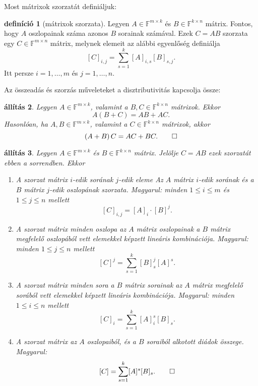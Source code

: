 \documentclass[9pt, a4paper, showtrims]{memoir}
\theoremstyle{plain}
\newtheorem{proposition}{állítás}[chapter]
\theoremstyle{remark}
\theoremstyle{definition}
\newtheorem{definition}[proposition]{definíció}
\begin{document}
Most mátrixok szorzatát definiáljuk:
\begin{definition}[mátrixok szorzata]
    Legyen $A\in\mathbb{F}^{m\times k}$ és $B\in\mathbb{F}^{k\times n}$ mátrix.
    Fontos, hogy $A$ oszlopainak száma azonos $B$ sorainak számával.
    Ezek $C=AB$ szorzata egy $C\in\mathbb{F}^{m\times n}$ mátrix,
    melynek elemeit az alábbi egyenlőség definiálja
    \[
        [C]_{i,j}=\sum_{s=1}^k[A]_{i,s}[B]_{s,j}.
    \]
    Itt persze $i=1,\dots,m$ és $j=1,\dots,n.$
\end{definition}
Az összeadás és szorzás műveleteket a disztributivitás kapcsolja össze:
\begin{proposition}
    Legyen $A\in\mathbb{F}^{m\times k}$, valamint a $B,C\in\mathbb{F}^{k\times n}$ mátrixok.
    Ekkor
    \begin{displaymath}
        A\left( B+C \right)=AB+AC.
    \end{displaymath}
    Hasonlóan,
    ha $A,B\in\mathbb{F}^{m\times k}$, valamint a $C\in\mathbb{F}^{k\times n}$ mátrixok,
    akkor
    \begin{displaymath}
        \left( A+B \right)C=AC+BC.\qedhere
    \end{displaymath}
\end{proposition}
\begin{proposition}
    Legyen $A\in\mathbb{F}^{m\times k}$ és $B\in\mathbb{F}^{k\times n}$ mátrix.
    Jelölje $C=AB$ ezek szorzatát ebben a sorrendben.
    Ekkor
    \begin{enumerate}
        \item A szorzat mátrix $i$-edik sorának $j$-edik eleme Az $A$ mátrix $i$-edik sorának és a $B$ mátrix $j$-edik
            oszlopának szorzata. Magyarul: minden $1\leq i\leq m$ és $1\leq j \leq n$ mellett
            \[
                [C]_{i,j}=[A]_i\cdot [B]^j.
            \]
        \item
            A szorzat mátrix minden oszlopa az $A$ mátrix oszlopainak a $B$ mátrix megfelelő oszlopából vett elemekkel képzett
            lineáris kombinációja.
            Magyarul: minden $1\leq j\leq n$ mellett
            \[
                [C]^j=\sum_{s=1}^k[B]_s^j[A]^s.
            \]
        \item
            A szorzat mátrix minden sora a $B$ mátrix sorainak az $A$ mátrix megfelelő sorából vett elemekkel képzett
            lineáris kombinációja.
            Magyarul: minden $1\leq i\leq n$ mellett
            \[
                [C]_i=\sum_{s=1}^k[A]_i^s[B]_s.
            \]
        \item
            A szorzat mátrix az $A$ oszlopaiból, és a $B$ soraiból alkotott diádok összege.
            Magyarul:
            \[
                [C]=\sum_{s=1}^k[A]^s[B]_s.\qedhere
            \]
    \end{enumerate}
\end{proposition}
\end{document}
